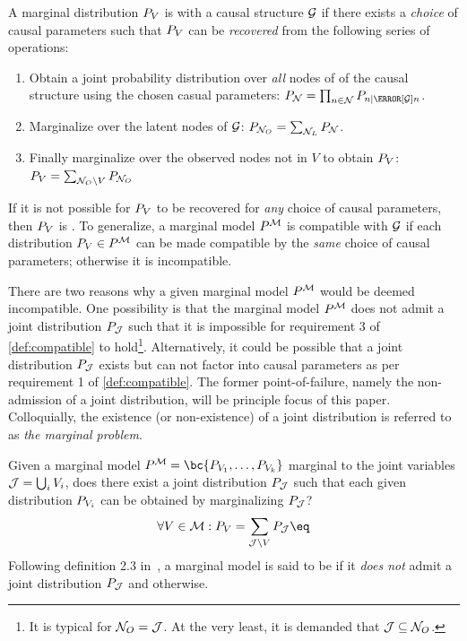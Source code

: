 \documentclass[aps, 10pt, english, twoside, pra, nofootinbib, longbibliography]{revtex4-1}
\begin{document}
    \begin{definition}
        \label{def:compatible}
        A marginal distribution $\prob[V]$ is  with a causal structure $\mathcal{G}$ if there exists a \textit{choice} of causal parameters such that $\prob[V]$ can be \textit{recovered} from the following series of operations:
        \begin{enumerate}
            \item Obtain a joint probability distribution over \textit{all} nodes of of the causal structure using the chosen casual parameters: $\prob[\nodes] = \prod_{n \in \nodes} \prob[n \mid \Pa[\graph]{n}]$.
            \item Marginalize over the latent nodes of $\mathcal{G}$: $\prob[\nodes_O] = \sum_{\nodes_L} \prob[\nodes]$.
            \item Finally marginalize over the observed nodes not in $V$ to obtain $\prob[V]$: $\prob[V] = \sum_{\nodes_O \setminus V} \prob[\nodes_O]$
        \end{enumerate}
        If it is not possible for $\prob[V]$ to be recovered for \textit{any} choice of causal parameters, then $\prob[V]$ is . To generalize, a marginal model $\prob^{\mscenario}$ is compatible with $\mathcal{G}$ if each distribution $\prob[V] \in \prob^{\mscenario}$ can be made compatible by the \textit{same} choice of causal parameters; otherwise it is incompatible.
    \end{definition}

    There are two reasons why a given marginal model $\prob^{\mscenario}$ would be deemed incompatible. One possibility is that the marginal model $\prob^{\mscenario}$ does not admit a joint distribution $\prob[\jointvar]$ such that it is impossible for requirement 3 of \cref{def:compatible} to hold\footnote{It is typical for $\mathcal{N}_O = \mathcal{J}$. At the very least, it is demanded that $\mathcal{J} \subseteq \mathcal{N}_O$.}. Alternatively, it could be possible that a joint distribution $\prob[\jointvar]$ exists but can not factor into causal parameters as per requirement 1 of \cref{def:compatible}. The former point-of-failure, namely the non-admission of a joint distribution, will be principle focus of this paper. Colloquially, the existence (or non-existence) of a joint distribution is referred to as \textit{the marginal problem}.

    \begin{definition}
        \label{def:marginal_problem}
         Given a marginal model $\prob^{\mscenario} = \bc{\prob[V_1], \ldots, \prob[V_k]}$ marginal to the joint variables $\mathcal{J} = \bigcup_{i} V_i$, does there exist a joint distribution $\prob[\jointvar]$ such that each given distribution $\prob[V_i]$ can be obtained by marginalizing $\prob[\jointvar]$?
        \[ \forall V \in \mscenario : \prob[V] = \sum_{\jointvar \setminus V} \prob[\jointvar] \eq \label{eq:def:marginal_problem}\]
        Following definition 2.3 in~\cite{Fritz_2011}, a marginal model is said to be  if it \textit{does not} admit a joint distribution $\prob[\jointvar]$ and  otherwise.
    \end{definition}
\end{document}

